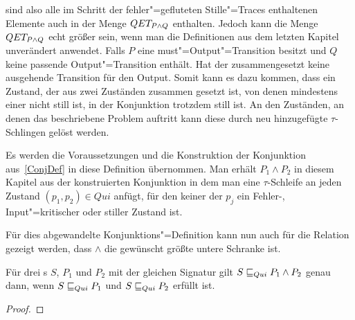 sind also alle im Schritt der fehler"=gefluteten Stille"=Traces enthaltenen
Elemente auch in der Menge $QET _{P\land Q}$ enthalten. Jedoch kann die Menge
$QET _{P\land Q}$ echt größer sein, wenn man die Definitionen aus dem letzten
Kapitel unverändert anwendet. Falls $P$ eine must"=Output"=Transition besitzt
und $Q$ keine passende Output"=Transition enthält. Hat der zusammengesetzt
keine ausgehende Transition für den Output. Somit kann es dazu kommen, dass ein
Zustand, der aus zwei Zuständen zusammen gesetzt ist, von denen mindestens
einer nicht still ist, in der Konjunktion trotzdem still ist. An den Zuständen,
an denen das beschriebene Problem auftritt kann diese durch neu hinzugefügte
$\tau$-Schlingen gelöst werden.

\begin{Def}[Konjunktion]
  Es werden die Voraussetzungen und die Konstruktion der Konjunktion
  aus~\ref{ConjDef} in diese Definition übernommen. Man erhält $P_1\land P_2$
  in diesem Kapitel aus der konstruierten Konjunktion in dem man eine
  $\tau$-Schleife an jeden Zustand $(p_1,p_2)\in Qui$ anfügt, für den keiner
  der $p_j$ ein Fehler-, Input"=kritischer oder stiller Zustand ist.
\end{Def}

Für dies abgewandelte Konjunktions"=Definition kann nun auch für die Relation
\QRel{} gezeigt werden, dass $\land$ die gewünscht größte untere Schranke ist.

\begin{Satz}[Konjunktion]
  Für drei \MEIO{}s $S$, $P_1$ und $P_2$ mit der gleichen Signatur gilt $S \sqsubseteq  _{Qui}
  P_1\land P_2$ genau dann, wenn $S \sqsubseteq  _{Qui} P_1$ und $S \sqsubseteq  _{Qui} P_2$ erfüllt ist.
\end{Satz}

\begin{proof}
\end{proof}
